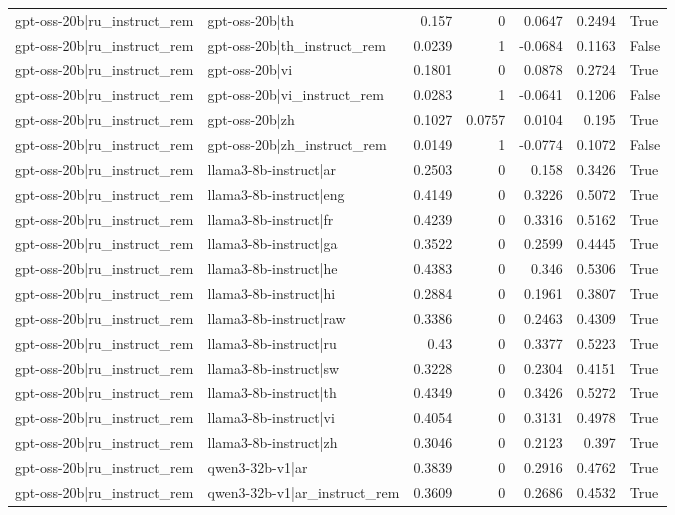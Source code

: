 \begin{table}
\begin{tabular}{l l r r r r l}
gpt-oss-20b|ru_instruct_rem & gpt-oss-20b|th & 0.157 & 0 & 0.0647 & 0.2494 & True \\
gpt-oss-20b|ru_instruct_rem & gpt-oss-20b|th_instruct_rem & 0.0239 & 1 & -0.0684 & 0.1163 & False \\
gpt-oss-20b|ru_instruct_rem & gpt-oss-20b|vi & 0.1801 & 0 & 0.0878 & 0.2724 & True \\
gpt-oss-20b|ru_instruct_rem & gpt-oss-20b|vi_instruct_rem & 0.0283 & 1 & -0.0641 & 0.1206 & False \\
gpt-oss-20b|ru_instruct_rem & gpt-oss-20b|zh & 0.1027 & 0.0757 & 0.0104 & 0.195 & True \\
gpt-oss-20b|ru_instruct_rem & gpt-oss-20b|zh_instruct_rem & 0.0149 & 1 & -0.0774 & 0.1072 & False \\
gpt-oss-20b|ru_instruct_rem & llama3-8b-instruct|ar & 0.2503 & 0 & 0.158 & 0.3426 & True \\
gpt-oss-20b|ru_instruct_rem & llama3-8b-instruct|eng & 0.4149 & 0 & 0.3226 & 0.5072 & True \\
gpt-oss-20b|ru_instruct_rem & llama3-8b-instruct|fr & 0.4239 & 0 & 0.3316 & 0.5162 & True \\
gpt-oss-20b|ru_instruct_rem & llama3-8b-instruct|ga & 0.3522 & 0 & 0.2599 & 0.4445 & True \\
gpt-oss-20b|ru_instruct_rem & llama3-8b-instruct|he & 0.4383 & 0 & 0.346 & 0.5306 & True \\
gpt-oss-20b|ru_instruct_rem & llama3-8b-instruct|hi & 0.2884 & 0 & 0.1961 & 0.3807 & True \\
gpt-oss-20b|ru_instruct_rem & llama3-8b-instruct|raw & 0.3386 & 0 & 0.2463 & 0.4309 & True \\
gpt-oss-20b|ru_instruct_rem & llama3-8b-instruct|ru & 0.43 & 0 & 0.3377 & 0.5223 & True \\
gpt-oss-20b|ru_instruct_rem & llama3-8b-instruct|sw & 0.3228 & 0 & 0.2304 & 0.4151 & True \\
gpt-oss-20b|ru_instruct_rem & llama3-8b-instruct|th & 0.4349 & 0 & 0.3426 & 0.5272 & True \\
gpt-oss-20b|ru_instruct_rem & llama3-8b-instruct|vi & 0.4054 & 0 & 0.3131 & 0.4978 & True \\
gpt-oss-20b|ru_instruct_rem & llama3-8b-instruct|zh & 0.3046 & 0 & 0.2123 & 0.397 & True \\
gpt-oss-20b|ru_instruct_rem & qwen3-32b-v1|ar & 0.3839 & 0 & 0.2916 & 0.4762 & True \\
gpt-oss-20b|ru_instruct_rem & qwen3-32b-v1|ar_instruct_rem & 0.3609 & 0 & 0.2686 & 0.4532 & True \\

\end{tabular}
\end{table}

